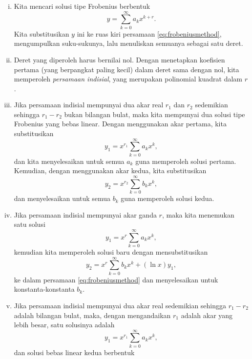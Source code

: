 \begin{enumerate}[(i)]
\item
Kita mencari solusi tipe Frobenius berbentuk
\begin{equation*}
y = \sum_{k=0}^\infty a_k x^{k+r} .
\end{equation*}
Kita substitusikan $y$ ini ke ruas kiri
persamaan \eqref{eq:frobeniusmethod}, mengumpulkan
suku-sukunya, lalu menuliskan semuanya sebagai satu deret.
\item
Deret yang diperoleh harus bernilai nol. Dengan menetapkan koefisien pertama
(yang berpangkat paling kecil) dalam deret
sama dengan nol, kita memperoleh
\emph{persamaan indisial}, yang merupakan polinomial kuadrat dalam $r$.
\item
Jika persamaan indisial mempunyai dua akar real $r_1$ dan $r_2$
sedemikian sehingga $r_1 - r_2$ bukan bilangan bulat, maka kita mempunyai dua solusi tipe
Frobenius yang bebas linear. Dengan menggunakan akar pertama, kita substitusikan
\begin{equation*}
y_1 = x^{r_1} \sum_{k=0}^\infty a_k x^{k} ,
\end{equation*}
dan kita menyelesaikan untuk semua $a_k$ guna memperoleh solusi pertama. Kemudian,
dengan menggunakan akar kedua,
kita substitusikan
\begin{equation*}
y_2 = x^{r_2} \sum_{k=0}^\infty b_k x^{k} ,
\end{equation*}
dan menyelesaikan untuk semua $b_k$ guna memperoleh solusi kedua.
\item
Jika persamaan indisial mempunyai akar ganda $r$, maka kita menemukan 
satu solusi
\begin{equation*}
y_1 = x^{r} \sum_{k=0}^\infty a_k x^{k} ,
\end{equation*}
kemudian kita memperoleh solusi baru dengan mensubstitusikan
\begin{equation*}
y_2 = x^{r} \sum_{k=0}^\infty b_k x^{k} + (\ln x) y_1 ,
\end{equation*}
ke dalam persamaan \eqref{eq:frobeniusmethod} dan menyelesaikan untuk konstanta-konstanta $b_k$.
\item
Jika persamaan indisial mempunyai dua akar real sedemikian sehingga $r_1-r_2$
adalah bilangan bulat, maka, dengan mengandaikan $r_1$ adalah akar yang lebih besar, satu solusinya adalah
\begin{equation*}
y_1 = x^{r_1} \sum_{k=0}^\infty a_k x^{k} ,
\end{equation*}
dan solusi bebas linear kedua berbentuk
\begin{equation*}

\end{equation*}
\end{enumerate}
